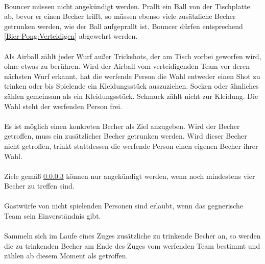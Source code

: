 \paragraph{}
\glqq Bouncer\grqq{} müssen nicht angekündigt werden.
Prallt ein Ball von der Tischplatte ab, bevor er einen Becher trifft, so müssen ebenso viele zusätzliche Becher getrunken werden, wie der Ball aufgeprallt ist.
Bouncer dürfen entsprechend \ref{Bier-Pong:Verteidigen} abgewehrt werden.

\paragraph{}
Als \glqq Airball\grqq{} zählt jeder Wurf außer Trickshots, der am Tisch vorbei geworfen wird, ohne etwas zu berühren.
Wird der Airball vom verteidigenden Team vor deren nächsten Wurf erkannt, hat die werfende Person die Wahl entweder einen Shot zu trinken oder bis Spielende ein Kleidungsstück auszuziehen.
Socken oder ähnliches zählen gemeinsam als ein Kleidungsstück.
Schmuck zählt nicht zur Kleidung.
Die Wahl steht der werfenden Person frei.

\paragraph{} \label{Bier-Pong:Werfen:Ankündigen}
Es ist möglich einen konkreten Becher als Ziel anzugeben.
Wird der Becher getroffen, muss ein zusätzlicher Becher getrunken werden.
Wird dieser Becher nicht getroffen, trinkt stattdessen die werfende Person einen eigenen Becher ihrer Wahl.

\paragraph{}
Ziele gemäß \ref{Bier-Pong:Werfen:Ankündigen} können nur angekündigt werden, wenn noch mindestens vier Becher zu treffen sind.

\paragraph{}
Gastwürfe von nicht spielenden Personen sind erlaubt, wenn das gegnerische Team sein Einverständnis gibt.

\paragraph{}
Sammeln sich im Laufe eines Zuges zusätzliche zu trinkende Becher an, so werden die zu trinkenden Becher am Ende des Zuges vom werfenden Team bestimmt und zählen ab diesem Moment als getroffen.

